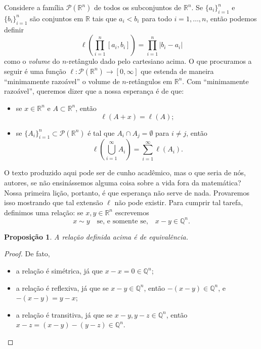 \documentclass{article}
\newtheorem{proposition}[definition]{Proposição}
\begin{document}
Considere a família $\mathcal{P}(\mathbb{R}^n)$ de todos os subconjuntos de $\mathbb{R}^n$. Se $\{a_i\}_{i = 1}^n$ e $\{b_i\}_{i = 1}^n$ são conjuntos em $\mathbb{R}$ tais que $a_i < b_i$ para todo $i = 1, \dots, n$, então podemos definir $$\ell\left(\prod_{i = 1}^n [a_i, b_i]\right) = \prod_{i = 1}^n |b_i - a_i|$$ como o \textit{volume} do $n$-retângulo dado pelo cartesiano acima. O que procuramos a seguir é uma função $\ell \colon \mathcal{P}(\mathbb{R}^n) \to [0, \infty]$ que estenda de maneira ``minimamente razoável'' o volume de $n$-retângulos em $\mathbb{R}^n$. Com ``minimamente razoável'', queremos dizer que a nossa esperança é de que: \begin{itemize}
    \item se $x \in \mathbb{R}^n$ e $A \subset \mathbb{R}^n$, então $$\ell(A + x) = \ell(A);$$
    \item se $\{A_i\}_{i = 1}^n \subset \mathcal{P}(\mathbb{R}^n)$ é tal que $A_i \cap A_j = \emptyset$ para $i \neq j$, então $$\ell\left(\bigcup_{i = 1}^\infty A_i\right) = \sum_{i = 1}^\infty \ell(A_i).$$ 
\end{itemize}
O texto produzido aqui pode ser de cunho acadêmico, mas o que seria de nós, autores, se não ensinássemos alguma coisa sobre a vida fora da matemática? Nossa primeira lição, portanto, é que esperança não serve de nada. Provaremos isso mostrando que tal extensão $\ell$ não pode existir. Para cumprir tal tarefa, definimos uma relação: se $x, y \in \mathbb{R}^n$ escrevemos $$x \sim y \quad \text{se, e somente se,} \quad x - y \in \mathbb{Q}^n.$$

\begin{proposition}
    A relação definida acima é de equivalência.
\end{proposition}
\begin{proof}
    De fato, \begin{itemize}
        \item a relação é simétrica, já que $x - x = 0 \in \mathbb{Q}^n$;
        \item a relação é reflexiva, já que se $x - y \in \mathbb{Q}^n$, então $- (x - y) \in \mathbb{Q}^n$, e $-(x-y) = y-x$;
        \item a relação é transitiva, já que se $x - y, y - z \in \mathbb{Q}^n$, então $x - z = (x - y) - (y - z) \in \mathbb{Q}^n$.
    \end{itemize}
\end{proof}

\nocite{*}
\printbibliography
\end{document}
